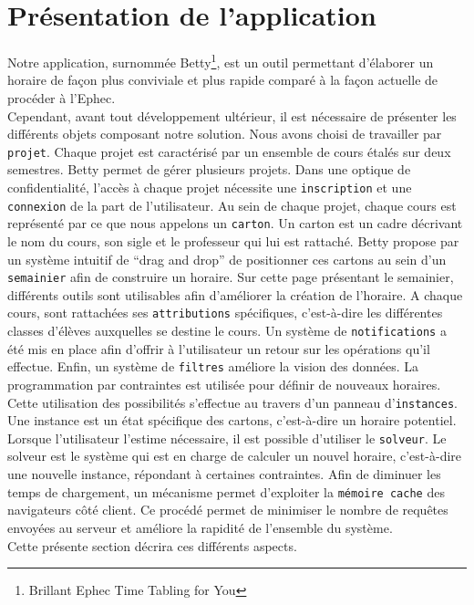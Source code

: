 

\chapter{Présentation de l'application}
Notre application, surnommée Betty\footnote{Brillant Ephec Time Tabling for You}, est un outil permettant d'élaborer un horaire de façon plus conviviale et plus rapide comparé à la façon actuelle de procéder à l'Ephec.\\
\newline
\indent
Cependant, avant tout développement ultérieur, il est nécessaire de présenter les différents objets composant notre solution. Nous avons choisi de travailler par \texttt{projet}. Chaque projet est caractérisé par un ensemble de cours étalés sur deux semestres. Betty permet de gérer plusieurs projets. Dans une optique de confidentialité, l'accès à chaque projet nécessite une \texttt{inscription} et une \texttt{connexion} de la part de l'utilisateur.
\newline
\indent
Au sein de chaque projet, chaque cours est représenté par ce que nous appelons un \texttt{carton}. Un carton est un cadre décrivant le nom du cours, son sigle et le professeur qui lui est rattaché. Betty propose par un système intuitif de \enquote{drag and drop} de positionner ces cartons au sein d'un \texttt{semainier} afin de construire un horaire.
\newline
\indent
Sur cette page présentant le semainier, différents outils sont utilisables afin d'améliorer la création de l'horaire. A chaque cours, sont rattachées ses \texttt{attributions} spécifiques, c'est-à-dire les différentes classes d'élèves auxquelles se destine le cours. Un système de \texttt{notifications} a été mis en place afin d'offrir à l'utilisateur un retour sur les opérations qu'il effectue. Enfin, un système de \texttt{filtres} améliore la vision des données. 
\newline
\indent
La programmation par contraintes est utilisée pour définir de nouveaux horaires. Cette utilisation des possibilités s'effectue au travers d'un panneau d'\texttt{instances}. Une instance  est un état spécifique des cartons, c'est-à-dire un horaire potentiel. Lorsque l'utilisateur l'estime nécessaire, il est possible d'utiliser le  \texttt{solveur}. Le solveur est le système qui est en charge de calculer un nouvel horaire, c'est-à-dire une nouvelle instance, répondant à certaines contraintes.
\newline
\indent
Afin de diminuer les temps de chargement, un mécanisme permet d'exploiter la \texttt{mémoire cache} des navigateurs côté client. Ce procédé permet de minimiser le nombre de requêtes envoyées au serveur et améliore la rapidité de l'ensemble du système.\\
\newline
\indent
Cette présente section décrira ces différents aspects.


